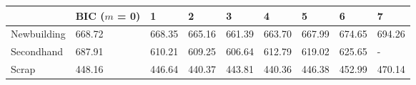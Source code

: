 
\begin{tabular}[t]{lllllllll}
\toprule
  & BIC ($m$ = 0) & 1 & 2 & 3 & 4 & 5 & 6 & 7\\
\midrule
Newbuilding & 668.72 & 668.35 & 665.16 & 661.39 & 663.70 & 667.99 & 674.65 & 694.26\\
Secondhand & 687.91 & 610.21 & 609.25 & 606.64 & 612.79 & 619.02 & 625.65 & -\\
Scrap & 448.16 & 446.64 & 440.37 & 443.81 & 440.36 & 446.38 & 452.99 & 470.14\\
\bottomrule
\end{tabular}
